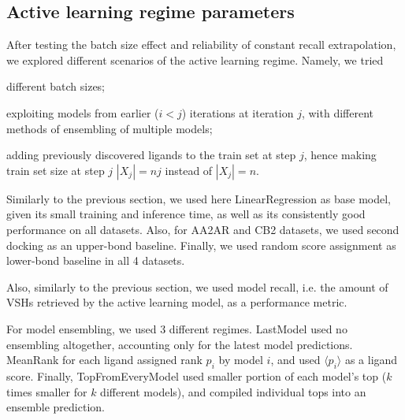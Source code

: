 \subsection{Active learning regime parameters}

After testing the batch size effect and reliability of constant recall extrapolation, we explored different scenarios of the active learning regime. Namely, we tried
\begin{enumerate*}[label=(\roman*)]
    \item different batch sizes;
    \item exploiting models from earlier ($i < j$) iterations at iteration $j$, with different methods of ensembling of multiple models;
    \item adding previously discovered ligands to the train set at step $j$, hence making train set size at step $j$ $|X_j| = nj$ instead of $|X_j|=n$.    
\end{enumerate*}

Similarly to the previous section, we used here LinearRegression as base model, given its small training and inference time, as well as its consistently good performance on all datasets. Also, for AA2AR and CB2 datasets, we used second docking as an upper-bond baseline. Finally, we used random score assignment as lower-bond baseline in all 4 datasets. 

Also, similarly to the previous section, we used model recall, i.e. the amount of VSHs retrieved by the active learning model, as a performance metric.

For model ensembling, we used 3 different regimes. LastModel used no ensembling altogether, accounting only for the latest model predictions. MeanRank for each ligand assigned rank $p_i$ by model $i$, and used $\langle p_i \rangle$ as a ligand score. Finally, TopFromEveryModel used smaller portion of each model's top ($k$ times smaller for $k$ different models), and compiled individual tops into an ensemble prediction.



